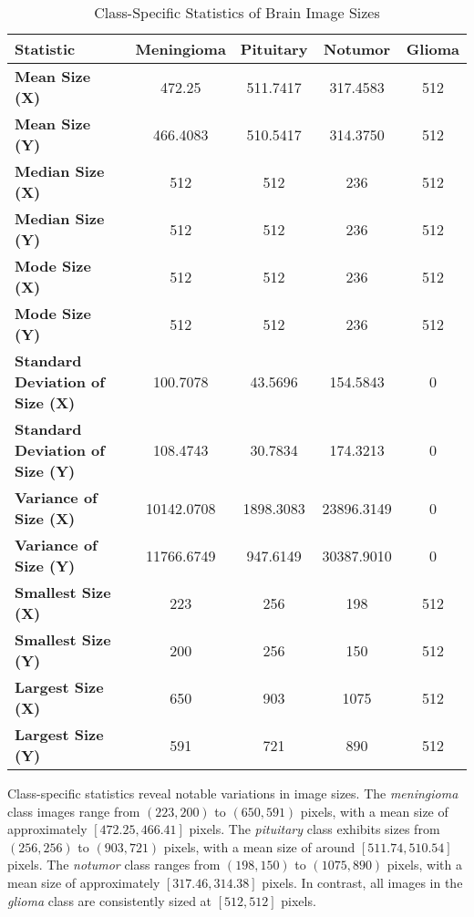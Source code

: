 \begin{table}[ht]
\centering
\begin{tabular}{|l|c|c|c|c|}
\hline
\textbf{Statistic} & \textbf{Meningioma} & \textbf{Pituitary} & \textbf{Notumor} & \textbf{Glioma} \\
\hline
\textbf{Mean Size (X)} & 472.25 & 511.7417 & 317.4583 & 512 \\
\hline
\textbf{Mean Size (Y)} & 466.4083 & 510.5417 & 314.3750 & 512 \\
\hline
\textbf{Median Size (X)} & 512 & 512 & 236 & 512 \\
\hline
\textbf{Median Size (Y)} & 512 & 512 & 236 & 512 \\
\hline
\textbf{Mode Size (X)} & 512 & 512 & 236 & 512 \\
\hline
\textbf{Mode Size (Y)} & 512 & 512 & 236 & 512 \\
\hline
\textbf{Standard Deviation of Size (X)} & 100.7078 & 43.5696 & 154.5843 & 0 \\
\hline
\textbf{Standard Deviation of Size (Y)} & 108.4743 & 30.7834 & 174.3213 & 0 \\
\hline
\textbf{Variance of Size (X)} & 10142.0708 & 1898.3083 & 23896.3149 & 0 \\
\hline
\textbf{Variance of Size (Y)} & 11766.6749 & 947.6149 & 30387.9010 & 0 \\
\hline
\textbf{Smallest Size (X)} & 223 & 256 & 198 & 512 \\
\hline
\textbf{Smallest Size (Y)} & 200 & 256 & 150 & 512 \\
\hline
\textbf{Largest Size (X)} & 650 & 903 & 1075 & 512 \\
\hline
\textbf{Largest Size (Y)} & 591 & 721 & 890 & 512 \\
\hline
\end{tabular}
\caption{Class-Specific Statistics of Brain Image Sizes}\label{tab:class_specific_sizes}
\end{table}

Class-specific statistics reveal notable variations in image sizes. The \textit{meningioma} class images range from $(223, 200)$ to $(650, 591)$ pixels, with a mean size of approximately $[472.25, 466.41]$ pixels. The \textit{pituitary} class exhibits sizes from $(256, 256)$ to $(903, 721)$ pixels, with a mean size of around $[511.74, 510.54]$ pixels. The \textit{notumor} class ranges from $(198, 150)$ to $(1075, 890)$ pixels, with a mean size of approximately $[317.46, 314.38]$ pixels. In contrast, all images in the \textit{glioma} class are consistently sized at $[512, 512]$ pixels.

